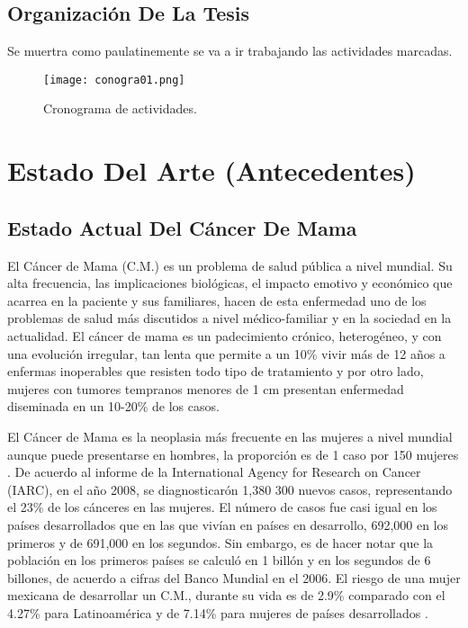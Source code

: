 \documentclass[10pt,a4paper]{article}
\begin{document}
\subsection{Organización De La Tesis}

Se muertra como paulatinemente se va a ir trabajando las actividades marcadas.

\begin{figure}[hbtp]
\centering
\texttt{[image: conogra01.png]}
\caption{Cronograma de actividades.}
\end{figure}



\section{Estado Del Arte (Antecedentes)}


\subsection{Estado Actual Del Cáncer De Mama}
El C\'ancer de Mama (C.M.) es un problema de salud p\'ublica a nivel mundial. Su alta frecuencia, las implicaciones biol\'ogicas, el impacto emotivo y econ\'omico que acarrea en la paciente y sus familiares, hacen de esta enfermedad uno de los problemas de salud m\'as discutidos a nivel m\'edico-familiar y en la sociedad en la actualidad. 
El c\'ancer de mama es un padecimiento cr\'onico, heterog\'eneo, y con una evoluci\'on irregular, tan lenta que permite a un 10\% vivir más de 12 a\~nos a enfermas inoperables que resisten todo tipo de tratamiento y por otro lado, mujeres con tumores tempranos menores de 1 cm presentan enfermedad diseminada en un 10-20\% de los casos\cite{torres2011}. 

El C\'ancer de Mama es la neoplasia m\'as frecuente en las mujeres a nivel mundial aunque puede presentarse en hombres, la proporci\'on es de 1 caso por 150 mujeres \cite{breast2004}. De acuerdo al informe de la International Agency for Research on Cancer (IARC), en el a\~no 2008, se diagnosticar\'on 1,380 300 nuevos casos, representando el 23\% de los c\'anceres en las mujeres. El n\'umero de casos fue casi igual en los pa\'ises desarrollados que en las que viv\'ian en pa\'ises en desarrollo, 692,000 en los primeros y de 691,000 en los segundos. Sin embargo, es de hacer notar que la poblaci\'on en los primeros pa\'ises se calcul\'o en 1 bill\'on y en los segundos de 6 billones, de acuerdo a cifras del Banco Mundial en el 2006\cite{leal2013}. 
El riesgo de una mujer mexicana de desarrollar un C.M., durante su vida es de 2.9\% comparado con el 4.27\% para Latinoam\'erica y de 7.14\% para mujeres de pa\'ises desarrollados \cite{moner2006,kotonya1998}.
\end{document}

